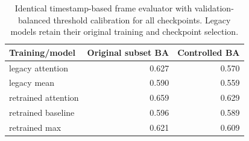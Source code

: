 \begin{table}[H]\centering\small
\caption{Identical timestamp-based frame evaluator with validation-balanced threshold calibration for all checkpoints. Legacy models retain their original training and checkpoint selection.}\label{tab:transfer}
\begin{tabular}{lrr}\toprule
Training/model & Original subset BA & Controlled BA \\\midrule
legacy attention & 0.627 & 0.570 \\
legacy mean & 0.590 & 0.559 \\
retrained attention & 0.659 & 0.629 \\
retrained baseline & 0.596 & 0.589 \\
retrained max & 0.621 & 0.609 \\
\bottomrule\end{tabular}\end{table}